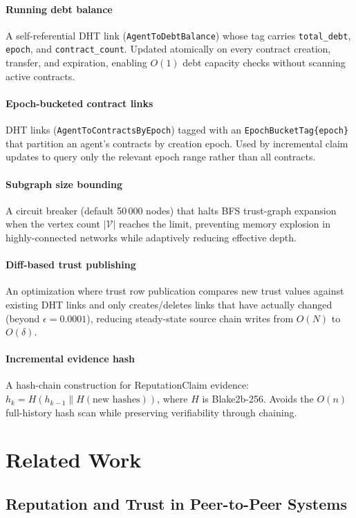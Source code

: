\documentclass[11pt]{article}
\begin{document}
\paragraph{Running debt balance} A self-referential DHT link (\texttt{Agent\-To\-Debt\-Balance}) whose tag carries \texttt{total\_debt}, \texttt{epoch}, and \texttt{contract\_count}. Updated atomically on every contract creation, transfer, and expiration, enabling $O(1)$ debt capacity checks without scanning active contracts.
\paragraph{Epoch-bucketed contract links} DHT links (\texttt{Agent\-To\-Contracts\-By\-Epoch}) tagged with an \texttt{Epoch\-Bucket\-Tag\{epoch\}} that partition an agent's contracts by creation epoch. Used by incremental claim updates to query only the relevant epoch range rather than all contracts.
\paragraph{Subgraph size bounding} A circuit breaker (default 50\,000 nodes) that halts BFS trust-graph expansion when the vertex count $|\mathcal{V}|$ reaches the limit, preventing memory explosion in highly-connected networks while adaptively reducing effective depth.
\paragraph{Diff-based trust publishing} An optimization where trust row publication compares new trust values against existing DHT links and only creates/deletes links that have actually changed (beyond $\epsilon = 0.0001$), reducing steady-state source chain writes from $O(N)$ to $O(\delta)$.
\paragraph{Incremental evidence hash} A hash-chain construction for ReputationClaim evidence: $h_k = H(h_{k-1} \| H(\text{new hashes}))$, where $H$ is Blake2b-256. Avoids the $O(n)$ full-history hash scan while preserving verifiability through chaining.

\appendix

\section{Related Work}
\label{sec:related}

\subsection{Reputation and Trust in Peer-to-Peer Systems}
\end{document}
